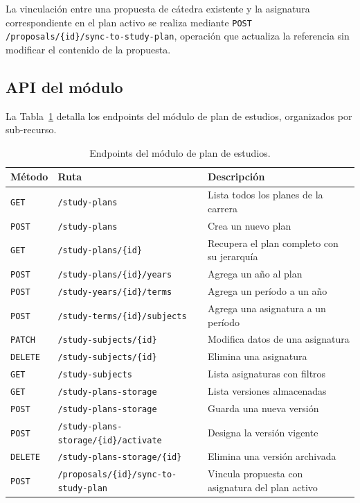 La vinculación entre una propuesta de cátedra existente y la asignatura
correspondiente en el plan activo se realiza mediante
\texttt{POST /proposals/\{id\}/sync-to-study-plan}, operación que
actualiza la referencia sin modificar el contenido de la propuesta.

\subsection{API del módulo}
\label{subsec:api_plan}

La Tabla~\ref{tab:api_plan} detalla los endpoints del módulo de plan
de estudios, organizados por sub-recurso.

\begin{table}[ht]
\centering
\caption{Endpoints del módulo de plan de estudios.}
\label{tab:api_plan}
\small
\begin{tabular}{llp{5.8cm}}
\toprule
\textbf{Método} & \textbf{Ruta} & \textbf{Descripción} \\
\midrule
\texttt{GET}    & \texttt{/study-plans}                              & Lista todos los planes de la carrera \\
\texttt{POST}   & \texttt{/study-plans}                              & Crea un nuevo plan \\
\texttt{GET}    & \texttt{/study-plans/\{id\}}                       & Recupera el plan completo con su jerarquía \\
\texttt{POST}   & \texttt{/study-plans/\{id\}/years}                 & Agrega un año al plan \\
\texttt{POST}   & \texttt{/study-years/\{id\}/terms}                 & Agrega un período a un año \\
\texttt{POST}   & \texttt{/study-terms/\{id\}/subjects}              & Agrega una asignatura a un período \\
\texttt{PATCH}  & \texttt{/study-subjects/\{id\}}                    & Modifica datos de una asignatura \\
\texttt{DELETE} & \texttt{/study-subjects/\{id\}}                    & Elimina una asignatura \\
\texttt{GET}    & \texttt{/study-subjects}                           & Lista asignaturas con filtros \\
\texttt{GET}    & \texttt{/study-plans-storage}                      & Lista versiones almacenadas \\
\texttt{POST}   & \texttt{/study-plans-storage}                      & Guarda una nueva versión \\
\texttt{POST}   & \texttt{/study-plans-storage/\{id\}/activate}      & Designa la versión vigente \\
\texttt{DELETE} & \texttt{/study-plans-storage/\{id\}}               & Elimina una versión archivada \\
\texttt{POST}   & \texttt{/proposals/\{id\}/sync-to-study-plan}      & Vincula propuesta con asignatura del plan activo \\
\bottomrule
\end{tabular}
\end{table}

